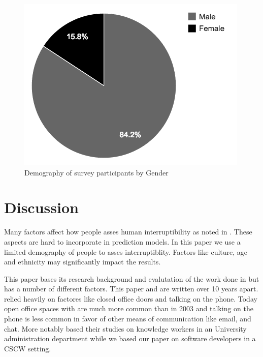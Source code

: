 \documentclass{sigchi}
\begin{document}
\begin{figure}[h]
  \centering
  \includegraphics[width=\columnwidth]{figures/demography_gender.png}
  \caption{Demography of survey participants by Gender}
  \label{fig:demography_gender}
\end{figure}


\section{Discussion}


Many factors affect how people asses human interruptibility as noted in \cite{Avrahami2007}.
These aspects are hard to incorporate in prediction models.
In this paper we use a limited demography of people to asses interruptiblity.
Factors like culture, age and ethnicity may significantly impact the results.

This paper bases its research background and evalutation of the work done in \cite{fogarty2005predicting} but has a number of different factors. This paper and \cite{fogarty2005predicting} are written over 10 years apart. \cite{fogarty2005predicting} relied heavily on factores like closed office doors and talking on the phone. Today open office spaces with are much more common than in 2003 and talking on the phone is less common in favor of other means of communication like email, and chat. More notably \cite{fogarty2005predicting} based their studies on knowledge workers in an University administration department while we based our paper on software developers in a CSCW setting.
\end{document}

